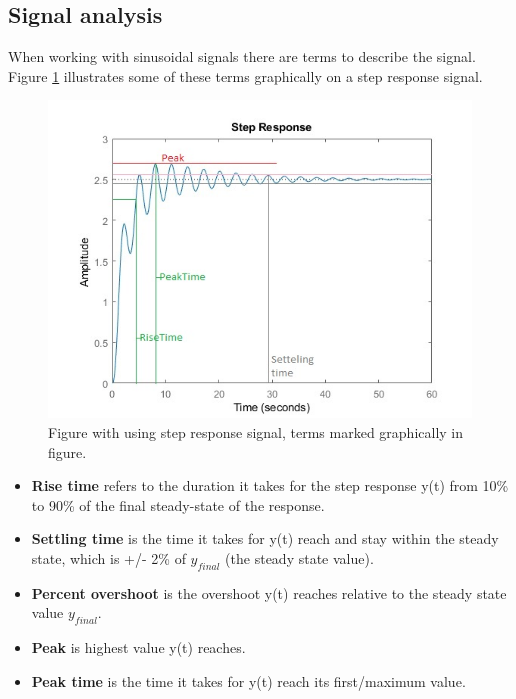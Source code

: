 \subsection{Signal analysis}
When working with sinusoidal signals there are terms to describe the signal. Figure \ref{fig:StepRespGraf} illustrates some of these terms graphically on a step response signal.

\begin{figure}[H]
 \centering 
    \includegraphics[scale=0.8]{Figures/StepResponse1.jpg}
    \caption{Figure with using step response signal, terms marked graphically in figure\cite{Risetime76:online}.}
    \label{fig:StepRespGraf}
\end{figure}

\begin{itemize}
    \item \textbf{Rise time} refers to the duration it takes for the step response y(t) from 10\% to 90\% of the final steady-state of the response\cite{Risetime76:online}.
    
    \item \textbf{Settling time} is the time it takes for y(t) reach and stay within the steady state, which is  +/- 2\% of $y_{final}$ (the steady state value)\cite{Risetime76:online}.
   
    \item \textbf{Percent overshoot} is the overshoot y(t) reaches relative to the steady state value $y_{final}$\cite{Risetime76:online}.

    \item \textbf{Peak} is highest value y(t) reaches\cite{Risetime76:online}.

    \item \textbf{Peak time} is the time it takes  for y(t) reach its first/maximum value\cite{Risetime76:online}. 
    
\end{itemize}
\newpage





